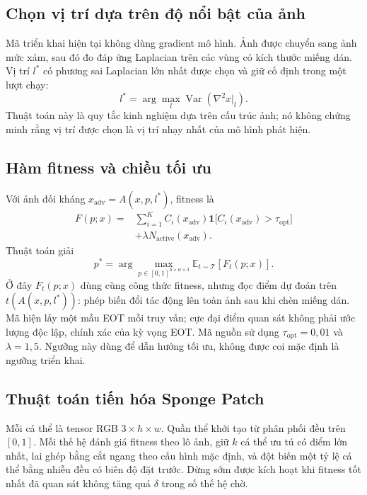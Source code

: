 \documentclass[a4paper,fleqn]{cas-dc}
\begin{document}
\subsection{Chọn vị trí dựa trên độ nổi bật của ảnh}

Mã triển khai hiện tại không dùng gradient mô hình. Ảnh được chuyển sang ảnh mức xám, sau đó đo đáp ứng Laplacian trên các vùng có kích thước miếng dán. Vị trí $l^*$ có phương sai Laplacian lớn nhất được chọn và giữ cố định trong một lượt chạy:
\[
l^*=\arg\max_l \operatorname{Var}\!\left(\nabla^2 x\big|_l\right).
\]
Thuật toán này là quy tắc kinh nghiệm dựa trên cấu trúc ảnh; nó không chứng minh rằng vị trí được chọn là vị trí nhạy nhất của mô hình phát hiện.

\subsection{Hàm fitness và chiều tối ưu}

Với ảnh đối kháng $x_{\mathrm{adv}}=A(x,p,l^*)$, fitness là
\[
\begin{aligned}
F(p;x)={}&\sum_{i=1}^{K}C_i(x_{\mathrm{adv}})
\mathbf{1}\big[C_i(x_{\mathrm{adv}})>\tau_{\mathrm{opt}}\big]\\
&+\lambda N_{\mathrm{active}}(x_{\mathrm{adv}}).
\end{aligned}
\]
Thuật toán giải
\[
p^*=\arg\max_{p\in[0,1]^{h\times w\times3}}
\mathbb{E}_{t\sim\mathcal{T}}\left[F_t(p;x)\right].
\]
Ở đây $F_t(p;x)$ dùng cùng công thức fitness, nhưng đọc điểm dự đoán trên $t(A(x,p,l^*))$: phép biến đổi tác động lên toàn ảnh sau khi chèn miếng dán. Mã hiện lấy một mẫu EOT mỗi truy vấn; cực đại điểm quan sát không phải ước lượng độc lập, chính xác của kỳ vọng EOT.
Mã nguồn sử dụng $\tau_{\mathrm{opt}}=0{,}01$ và $\lambda=1{,}5$. Ngưỡng này dùng để dẫn hướng tối ưu, không được coi mặc định là ngưỡng triển khai.

\subsection{Thuật toán tiến hóa Sponge Patch}

Mỗi cá thể là tensor RGB $3\times h\times w$. Quần thể khởi tạo từ phân phối đều trên $[0,1]$. Mỗi thế hệ đánh giá fitness theo lô ảnh, giữ $k$ cá thể ưu tú có điểm lớn nhất, lai ghép bằng cắt ngang theo cấu hình mặc định, và đột biến một tỷ lệ cá thể bằng nhiễu đều có biên độ đặt trước. Dừng sớm được kích hoạt khi fitness tốt nhất đã quan sát không tăng quá $\delta$ trong số thế hệ chờ.
\end{document}
